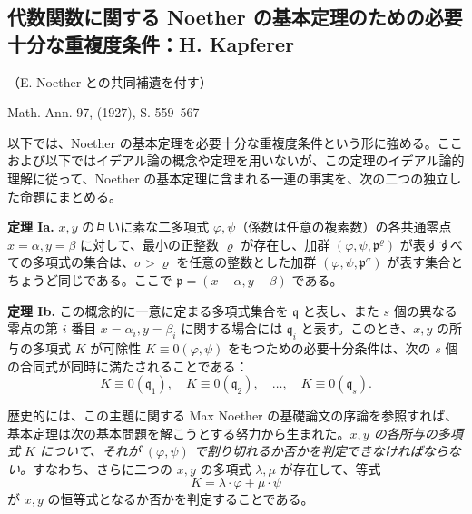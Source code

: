 \clearpage
\subsection*{代数関数に関する Noether の基本定理のための必要十分な重複度条件：H. Kapferer}\label{notwendige-und-hinreichende-multiplizitaetsbedingungen-zum-noetherschen-fundamentalsatz-der-algebraischen-funktionen}

\begin{center}
（E. Noether との共同補遺を付す）

Math. Ann. 97, (1927), S. 559--567
\end{center}

以下では、Noether の基本定理を必要十分な重複度条件という形に強める。ここおよび以下ではイデアル論の概念や定理を用いないが、この定理のイデアル論的理解に従って、Noether の基本定理に含まれる一連の事実を、次の二つの独立した命題にまとめる。

\textbf{定理 Ia.} \(x,y\) の互いに素な二多項式 \(\varphi,\psi\)（係数は任意の複素数）の各共通零点 \(x=\alpha, y=\beta\) に対して、最小の正整数 \(\varrho\) が存在し、加群 \((\varphi,\psi,\mathfrak{p}^\varrho)\) が表すすべての多項式の集合は、\(\sigma>\varrho\) を任意の整数とした加群 \((\varphi,\psi,\mathfrak{p}^\sigma)\) が表す集合とちょうど同じである。ここで \(\mathfrak{p}=(x-\alpha,y-\beta)\) である。

\textbf{定理 Ib.} この概念的に一意に定まる多項式集合を \(\mathfrak{q}\) と表し、また \(s\) 個の異なる零点の第 \(i\) 番目 \(x=\alpha_i, y=\beta_i\) に関する場合には \(\mathfrak{q}_i\) と表す。このとき、\(x,y\) の所与の多項式 \(K\) が可除性 \(K\equiv0(\varphi,\psi)\) をもつための必要十分条件は、次の \(s\) 個の合同式が同時に満たされることである：
\[
K\equiv0(\mathfrak{q}_1),\quad K\equiv0(\mathfrak{q}_2),\quad\ldots,\quad K\equiv0(\mathfrak{q}_s).
\]

歴史的には、この主題に関する Max Noether の基礎論文の序論を参照すれば、基本定理は次の基本問題を解こうとする努力から生まれた。\emph{\(x,y\) の各所与の多項式 \(K\) について、それが \((\varphi,\psi)\) で割り切れるか否かを判定できなければならない。}すなわち、さらに二つの \(x,y\) の多項式 \(\lambda,\mu\) が存在して、等式
\[
K=\lambda\cdot\varphi+\mu\cdot\psi
\]
が \(x,y\) の恒等式となるか否かを判定することである。

